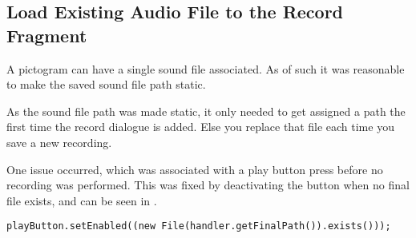 \subsection{Load Existing Audio File to the Record Fragment}
A pictogram can have a single sound file associated.
As of such it was reasonable to make the saved sound file path static.

As the sound file path was made static, it only needed to get assigned a path the first time the record dialogue is added. 
Else you replace that file each time you save a new recording.

One issue occurred, which was associated with a play button press before no recording was performed.
This was fixed by deactivating the button when no final file exists, and can be seen in .

\begin{lstlisting}[label={lst:playbuttonpress},caption = {Activating or Deactivating playButton}]
playButton.setEnabled((new File(handler.getFinalPath()).exists()));
\end{lstlisting}